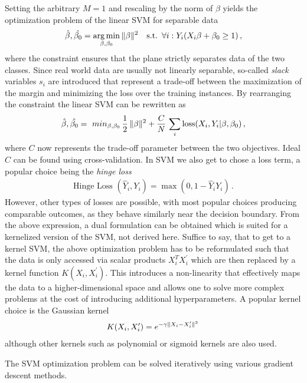 \documentclass[12pt, a4paper]{scrartcl}
\DeclareMathOperator*{\argmin}{arg\,min}
\DeclarePairedDelimiter\norm{\lVert}{\rVert}
\begin{document}
Setting the arbitrary $M=1$ and rescaling by the norm of $\beta$ yields the optimization problem of the linear SVM for separable data
\begin{align}
	\hat{\beta}, \hat{\beta_0} = \argmin_{\beta, \beta_0} \,  \norm{ \beta}^2 
	\quad \text{s.t.} \enspace \forall i: Y_i (X_i \beta + \beta_0 \ge 1) \, ,
\end{align}
where the constraint ensures that the plane strictly separates data of the two classes.
Since real world data are usually not linearly separable, so-called \emph{slack} variables $s_i$ are introduced that represent a trade-off between the maximization of the margin and minimizing the loss over the training instances. 
By rearranging the constraint the linear SVM can be rewritten as
\begin{align}
	\hat{\beta}, \hat{\beta_0} = \
	min_{\beta, \beta_0} \,  \frac{1}{2} \, \norm{ \beta }^2 + \frac{C}{N}\, \sum_i \text{loss} (X_i, Y_i | \beta, \beta_0) \, ,
\end{align}
where $C$ now represents the trade-off parameter between the two objectives. Ideal $C$ can be found using cross-validation. In SVM we also get to chose a loss term, a popular choice being the \emph{hinge loss}
\begin{align}
	\text{Hinge Loss }(\hat{Y}_i, Y_i) =  \max(0, 1-\hat{Y}_i  Y_i) \, .
\end{align}
However, other types of losses are possible, with most popular choices producing comparable outcomes, as they behave similarly near the decision boundary.
From the above expression, a dual formulation can be obtained which is suited for a kernelized version of the SVM, not derived here.
Suffice to say, that to get to a kernel SVM, the above optimization problem has to be reformulated such that the data is only accessed via scalar products $X_i^T X_i^\prime$ which are then replaced by a kernel function $K(X_i, X_i^\prime)$. This introduces a non-linearity that effectively maps the data to a higher-dimensional space and allows one to solve more complex problems at the cost of introducing additional hyperparameters.
A popular kernel choice is the Gaussian kernel
\begin{align}
	K(X_i, X_i^\prime) = e^{-\gamma \norm{ X_i - X_i^\prime }^2} \, 
\end{align}
although other kernels such as polynomial or sigmoid kernels are also used.

The SVM optimization problem can be solved iteratively using various gradient descent methods.%
\end{document}
